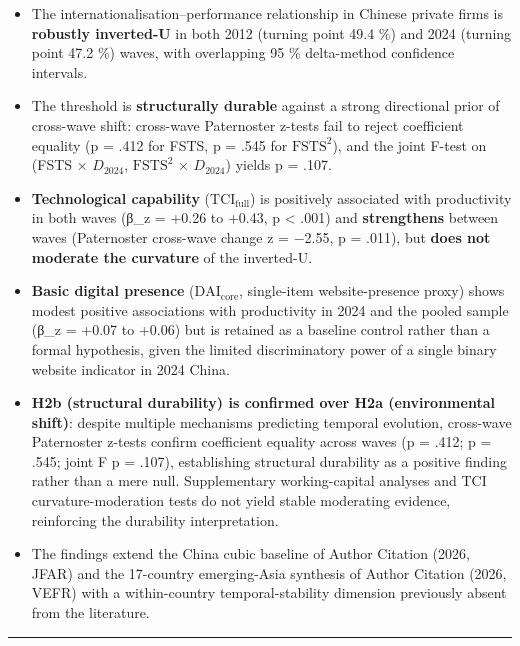 \documentclass[12pt,a4paper]{article}
\begin{document}
\begin{itemize}
\item
  The internationalisation--performance relationship in Chinese private
  firms is \textbf{robustly inverted-U} in both 2012 (turning point 49.4
  \%) and 2024 (turning point 47.2 \%) waves, with overlapping 95 \%
  delta-method confidence intervals.
\item
  The threshold is \textbf{structurally durable} against a strong
  directional prior of cross-wave shift: cross-wave Paternoster z-tests
  fail to reject coefficient equality (p = .412 for FSTS, p = .545 for
  \(\mathrm{FSTS}^2\)), and the joint F-test on (FSTS × \(D_{2024}\),
  \(\mathrm{FSTS}^2\) × \(D_{2024}\)) yields p = .107.
\item
  \textbf{Technological capability} (\(\mathrm{TCI}_{\text{full}}\)) is
  positively associated with productivity in both waves (β\_z = +0.26 to
  +0.43, p \textless{} .001) and \textbf{strengthens} between waves
  (Paternoster cross-wave change z = −2.55, p = .011), but \textbf{does
  not moderate the curvature} of the inverted-U.
\item
  \textbf{Basic digital presence} (\(\mathrm{DAI}_{\text{core}}\),
  single-item website-presence proxy) shows modest positive associations
  with productivity in 2024 and the pooled sample (β\_z = +0.07 to
  +0.06) but is retained as a baseline control rather than a formal
  hypothesis, given the limited discriminatory power of a single binary
  website indicator in 2024 China.
\item
  \textbf{H2b (structural durability) is confirmed over H2a
  (environmental shift)}: despite multiple mechanisms predicting
  temporal evolution, cross-wave Paternoster z-tests confirm coefficient
  equality across waves (p = .412; p = .545; joint F p = .107),
  establishing structural durability as a positive finding rather than a
  mere null. Supplementary working-capital analyses and TCI
  curvature-moderation tests do not yield stable moderating evidence,
  reinforcing the durability interpretation.
\item
  The findings extend the China cubic baseline of Author Citation (2026,
  JFAR) and the 17-country emerging-Asia synthesis of Author Citation
  (2026, VEFR) with a within-country temporal-stability dimension
  previously absent from the literature.
\end{itemize}

\begin{center}\rule{0.5\linewidth}{0.5pt}\end{center}
\end{document}
